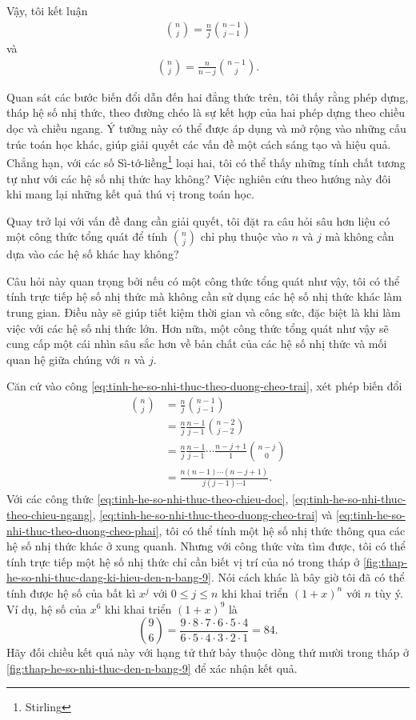\documentclass[12pt]{article} %
\begin{document}
Vậy, tôi kết luận
\begin{align}
    \binom{n}{j}=\frac{n}{j}\binom{n-1}{j-1} \label{eq:tinh-he-so-nhi-thuc-theo-duong-cheo-trai}
\end{align}
và
\begin{align}
    \binom{n}{j}=\frac{n}{n-j}\binom{n-1}{j}. \label{eq:tinh-he-so-nhi-thuc-theo-duong-cheo-phai}
\end{align}

Quan sát các bước biến đổi dẫn đến hai đẳng thức trên, tôi thấy rằng phép dựng, tháp hệ số nhị thức, theo đường chéo là sự kết hợp của hai phép dựng theo chiều dọc và chiều ngang. Ý tưởng này có thể được áp dụng và mở rộng vào những cấu trúc toán học khác, giúp giải quyết các vấn đề một cách sáng tạo và hiệu quả. Chẳng hạn, với các số Sì-tớ-liềng\footnote{Stirling} loại hai, tôi có thể thấy những tính chất tương tự như với các hệ số nhị thức hay không? Việc nghiên cứu theo hướng này đôi khi mang lại những kết quả thú vị trong toán học.

Quay trở lại với vấn đề đang cần giải quyết, tôi đặt ra câu hỏi sâu hơn liệu có một công thức tổng quát để tính \(\binom{n}{j}\) chỉ phụ thuộc vào \(n\) và \(j\) mà không cần dựa vào các hệ số khác hay không? 

Câu hỏi này quan trọng bởi nếu có một công thức tổng quát như vậy, tôi có thể tính trực tiếp hệ số nhị thức mà không cần sử dụng các hệ số nhị thức khác làm trung gian. Điều này sẽ giúp tiết kiệm thời gian và công sức, đặc biệt là khi làm việc với các hệ số nhị thức lớn. Hơn nữa, một công thức tổng quát như vậy sẽ cung cấp một cái nhìn sâu sắc hơn về bản chất của các hệ số nhị thức và mối quan hệ giữa chúng với \(n\) và \(j\).

Căn cứ vào công \eqref{eq:tinh-he-so-nhi-thuc-theo-duong-cheo-trai}, xét phép biến đổi 
    \begin{align*}
        \binom{n}{j} 
                &= \frac{n}{j}\binom{n-1}{j-1} \\
                &= \frac{n}{j}\frac{n-1}{j-1}\binom{n-2}{j-2} \\
                &= \frac{n}{j}\frac{n-1}{j-1} \cdots \frac{n-j+1}{1}\binom{n-j}{0} \\
                &= \frac{n(n-1)\cdots (n-j+1)}{j(j-1)\cdots 1}.
    \end{align*}
Với các công thức \eqref{eq:tinh-he-so-nhi-thuc-theo-chieu-doc}, \eqref{eq:tinh-he-so-nhi-thuc-theo-chieu-ngang}, \eqref{eq:tinh-he-so-nhi-thuc-theo-duong-cheo-trai} và \eqref{eq:tinh-he-so-nhi-thuc-theo-duong-cheo-phai}, tôi có thể tính một hệ số nhị thức thông qua các hệ số nhị thức khác ở xung quanh. Nhưng với công thức vừa tìm được, tôi có thể tính trực tiếp một hệ số nhị thức chỉ cần biết vị trí của nó trong tháp ở \autoref{fig:thap-he-so-nhi-thuc-dang-ki-hieu-den-n-bang-9}. Nói cách khác là bây giờ tôi đã có thể tính được hệ số của bất kì \(x^j\) với \(0\leq j \leq n\) khi khai triển \((1+x)^n\) với \(n\) tùy ý. Ví dụ, hệ số của \(x^6\) khi khai triển \((1+x)^9\) là
\[\binom{9}{6}=\frac{9\cdot 8\cdot 7\cdot 6\cdot 5 \cdot 4}{6\cdot 5\cdot 4\cdot 3\cdot 2\cdot 1}=84.\]
Hãy đối chiều kết quả này với hạng tử thứ bảy thuộc dòng thứ mười trong tháp ở \autoref{fig:thap-he-so-nhi-thuc-den-n-bang-9} để xác nhận kết quả.
\end{document}
